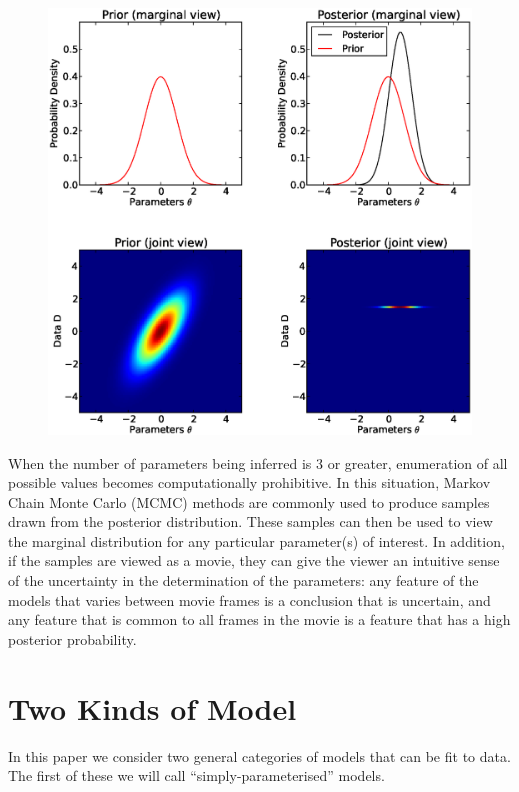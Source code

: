 \documentclass[letterpaper, 11pt]{article}
\begin{document}
\begin{figure}
\begin{center}
\includegraphics[scale=0.5]{joint_marginal.eps}
\end{center}
\end{figure}

When the number of parameters being inferred is 3 or greater, enumeration of
all possible values becomes computationally prohibitive. In this situation,
Markov Chain Monte Carlo (MCMC) methods are commonly used to produce samples
drawn from the posterior distribution. These samples can then be used to view
the marginal distribution for any particular parameter(s) of interest.
In addition, if the
samples are viewed as a movie, they can give the viewer an intuitive sense of
the uncertainty in the determination of the parameters: any feature of the
models that varies between movie frames is a conclusion that is uncertain, and any
feature that is common to all frames in the movie is a feature that has a high
posterior probability.

\section{Two Kinds of Model}
In this paper we consider two general categories of models that can be fit to
data. The first of these we will call ``simply-parameterised'' models.
\end{document}
